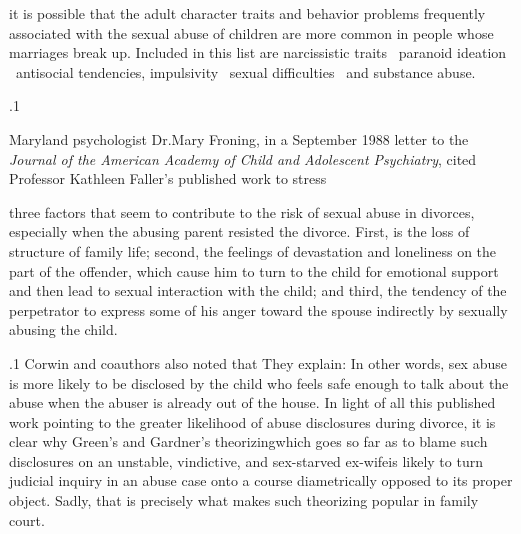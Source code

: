 \documentclass[11pt, twoside]{article}
\begin{document}
{{\begin{blockQuote}
it is possible that the adult character traits and behavior problems frequently associated with the sexual abuse of children are
more common in people whose marriages break up. Included in
this list are narcissistic traits \ellThree{2pt}{2pt}\ paranoid ideation \ellThree{2pt}{2pt}\ antisocial
tendencies, impulsivity \ellThree{2pt}{2pt}\ sexual difficulties \ellThree{2pt}{2pt}\ and substance
abuse.
\end{blockQuote}

}%

\p.1{%
Maryland psychologist Dr.\@ Mary Froning, in a September 1988
letter to the \textit{Journal of the American Academy of Child and Adolescent
Psychiatry}, cited Professor Kathleen Faller’s published work to stress

\begin{blockQuote}
three factors that seem to contribute to the risk of sexual abuse in
divorces, especially when the abusing parent resisted the divorce.
First, is the loss of structure of family life; second, the feelings
of devastation and loneliness on the part of the offender, which
cause him to turn to the child for emotional support and then
lead to sexual interaction with the child; and third, the tendency
of the perpetrator to express some of his anger toward the spouse
indirectly by sexually abusing the child.
\end{blockQuote}

}%

\p.1{%
Corwin and coauthors also noted that  They explain:  In other words, sex abuse is more
likely to be disclosed by the child who feels safe enough to talk about the
abuse when the abuser is already out of the house.
In light of all this published work pointing to the greater likelihood of
abuse disclosures during divorce, it is clear why Green’s and Gardner’s
theorizing\mdash{}which goes so far as to blame such disclosures on an unstable, vindictive, and sex-starved ex-wife\mdash{}is likely to turn judicial inquiry
in an abuse case onto a course diametrically opposed to its proper object.
Sadly, that is precisely what makes such theorizing popular in family
court.
}%


}
\end{document}
